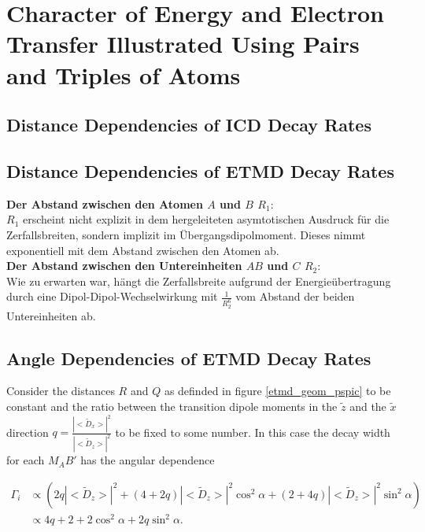 \section{Character of Energy and Electron Transfer Illustrated Using Pairs and Triples of Atoms}

\subsection{Distance Dependencies of ICD Decay Rates}



\subsection{Distance Dependencies of ETMD Decay Rates}
\textbf{Der Abstand zwischen den Atomen $A$ und $B$ $R_1$}:\\
$R_1$ erscheint nicht explizit in dem hergeleiteten asymtotischen Ausdruck für die Zerfallsbreiten, sondern implizit im Übergangsdipolmoment. Dieses nimmt exponentiell mit dem Abstand zwischen den Atomen ab.\\

\textbf{Der Abstand zwischen den Untereinheiten $AB$ und $C$ $R_2$}:\\
Wie zu erwarten war, hängt die Zerfallsbreite aufgrund der Energieübertragung durch eine Dipol-Dipol-Wechselwirkung mit $\frac{1}{R_2^6}$ vom Abstand der beiden Untereinheiten ab.\\


\subsection{Angle Dependencies of ETMD Decay Rates}
Consider the distances $R$ and $Q$ as definded in figure \ref{etmd_geom_pspic}
to be constant and the ratio between the transition dipole moments
in the $\tilde{z}$ and the $\tilde{x}$ direction
$q=\frac{|<\tilde{D}_x>|^2}{|<\tilde{D}_z>|^2}$ to be fixed to some number.
In this case the decay width for each $M_AB'$ has the angular dependence

\begin{align}
 \Gamma_i &\propto \left( 2q |<\tilde{D}_{z}>|^2 +
                  (4+2q)|<\tilde{D}_{z}>|^2 \cos^2\alpha +
                  (2+4q)|<\tilde{D}_{z}>|^2 \sin^2\alpha \right) \\
          &\propto 4q + 2 + 2 \cos^2\alpha + 2q \sin^2\alpha .
\end{align}

